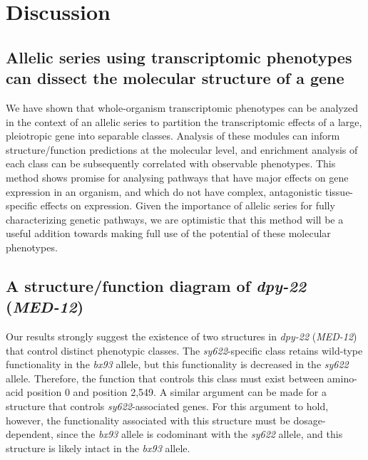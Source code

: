 \documentclass[10pt, twocolumn]{article}
\newcommand{\gene}[1]{\mbox{\emph{#1}}}
\newcommand{\dpy}{\gene{dpy-22} (\emph{MED-12})}
\begin{document}
%

\section*{Discussion}
\label{sec:conclusions}
\subsection*{Allelic series using transcriptomic phenotypes can dissect the
             molecular structure of a gene}
We have shown that whole-organism transcriptomic phenotypes can be analyzed in
the context of an allelic series to partition the transcriptomic effects of a
large, pleiotropic gene into separable classes. Analysis of these modules can
inform structure/function predictions at the molecular level, and enrichment
analysis of each class can be subsequently correlated with observable phenotypes.
This method shows promise for analysing pathways that have major effects on
gene expression in an organism, and which do not have complex, antagonistic
tissue-specific effects on expression. Given the importance of allelic series
for fully characterizing genetic pathways, we are optimistic that this method
will be a useful addition towards making full use of the potential of these
molecular phenotypes.

\subsection*{A structure/function diagram of \dpy{}}
Our results strongly suggest the existence of two structures in \dpy{} that
control distinct phenotypic classes. The \emph{sy622}-specific class retains
wild-type functionality in the \emph{bx93} allele, but this functionality is
decreased in the \emph{sy622} allele. Therefore, the function that controls this
class must exist between amino-acid position 0 and position 2,549. A similar
argument can be made for a structure that controls \emph{sy622}-associated
genes. For this argument to hold, however, the functionality associated with this
structure must be dosage-dependent, since the \emph{bx93} allele is codominant
with the \emph{sy622} allele, and this structure is likely intact in the
\emph{bx93} allele.
\end{document}
